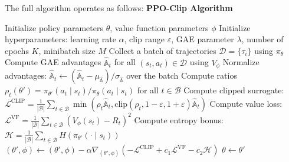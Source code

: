 \documentclass[11pt, letterpaper]{article}
\begin{document}
\begin{concept}
    The full algorithm operates as follows: 
    \algline
    \textbf{PPO-Clip Algorithm}
    \begin{algorithmic}[1]
    \State Initialize policy parameters \(\theta\), value function parameters \(\phi\)
    \State Initialize hyperparameters: learning rate \(\alpha\), clip range \(\varepsilon\), GAE parameter \(\lambda\), number of epochs \(K\), minibatch size \(M\)
        \State Collect a batch of trajectories \(\mathcal{D} = \{\tau_i\}\) using \(\pi_\theta\) 
        \State Compute GAE advantages \(\widehat{\mathbb{A}}_t\) for all \((s_t, a_t) \in \mathcal{D}\) using \(V_\phi\)
        \State Normalize advantages: \(\widehat{\mathbb{A}}_t \leftarrow (\widehat{\mathbb{A}}_t - \mu_{\widehat{\mathbb{A}}}) / \sigma_{\widehat{\mathbb{A}}}\) over the batch
                \State Compute ratios \(\rho_t(\theta') = \pi_{\theta'}(a_t \mid s_t) / \pi_\theta(a_t \mid s_t)\) for all \(t \in \mathcal{B}\) 
                \State Compute clipped surrogate: \(\mathcal{L}^{\text{CLIP}} = \frac{1}{|\mathcal{B}|}\sum_{t \in \mathcal{B}} \min(\rho_t \widehat{\mathbb{A}}_t, \text{clip}(\rho_t, 1{-}\varepsilon, 1{+}\varepsilon)\widehat{\mathbb{A}}_t)\) 
                \State Compute value loss: \(\mathcal{L}^{\text{VF}} = \frac{1}{|\mathcal{B}|}\sum_{t \in \mathcal{B}} (V_\phi(s_t) - R_t)^2\)
                \State Compute entropy bonus: \(\mathcal{H} = \frac{1}{|\mathcal{B}|}\sum_{t \in \mathcal{B}} H(\pi_{\theta'}(\cdot \mid s_t))\)
                \State \((\theta', \phi) \leftarrow (\theta', \phi) - \alpha \nabla_{(\theta', \phi)} (-\mathcal{L}^{\text{CLIP}} + c_1 \mathcal{L}^{\text{VF}} - c_2 \mathcal{H})\)
            \EndFor
        \EndFor
        \State \(\theta \leftarrow \theta'\)
    \EndFor
    \end{algorithmic}
    \algline
\end{concept}
\end{document}
